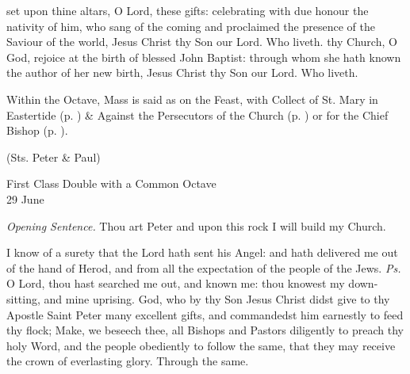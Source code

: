 \secret\label{JohnSecret}
 set upon thine altars, O Lord, these gifts: celebrating with due honour the nativity of him, who sang of the coming and proclaimed the presence of the Saviour of the world, Jesus Christ thy Son our Lord. Who liveth.
\postcommunion
\label{JohnPC}
 thy Church, O God, rejoice at the birth of blessed John Baptist: through whom she hath known the author of her new birth, Jesus Christ thy Son our Lord. Who liveth.
\begin{rubric}
    Within the Octave, Mass is said as on the Feast, with  Collect of St. Mary in Eastertide (p. \pageref{SPMaryInEaster}) \&  Against the Persecutors of the Church (p. \pageref{SPAgainst}) or for the Chief Bishop (p. \pageref{SPChiefBishop}).
\end{rubric}


\centerline{\small{(Sts. Peter \& Paul)}}

\begin{inhead}
    {First Class Double with a Common Octave\\
29 June}
\end{inhead}
\par\noindent
\textit{Opening Sentence.} Thou art Peter and upon this rock I will build my Church.%

\introit
{} I know of a surety that the Lord hath sent his Angel: and hath delivered me out of the hand of Herod, and from all the expectation of the people of the Jews. \textit{Ps.} O Lord, thou hast searched me out, and known me: thou knowest my down-sitting, and mine uprising.
\collect
{} God, who by thy Son Jesus Christ didst give to thy Apostle Saint Peter many excellent gifts, and commandedst him earnestly to feed thy flock; Make, we beseech thee, all Bishops and Pastors diligently to preach thy holy Word, and the people obediently to follow the same, that they may receive the crown of everlasting glory. Through the same.

